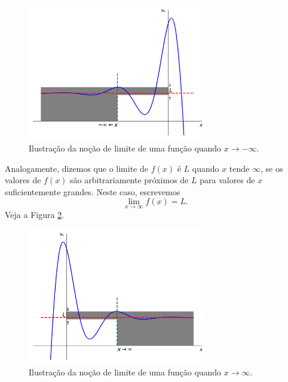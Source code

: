 \begin{figure}[H]
  \centering
  \includegraphics[width=0.7\textwidth]{./cap_lim/dados/fig_lim_x-infty/fig_lim_x-infty}
  \caption{Ilustração da noção de limite de uma função quando $x\to -\infty$.}
  \label{fig:lim_x-infty}
\end{figure}

Analogamente, dizemos que o limite de $f(x)$ é $L$ quando $x$ tende $\infty$, se os valores de $f(x)$ são arbitrariamente próximos de $L$ para valores de $x$ suficientemente grandes. Neste caso, escrevemos
\begin{equation}
  \lim_{x\to \infty} f(x) = L.
\end{equation}
Veja a Figura \ref{fig:lim_x2infty}.

\begin{figure}[H]
  \centering
  \includegraphics[width=0.7\textwidth]{./cap_lim/dados/fig_lim_x2infty/fig_lim_x2infty}
  \caption{Ilustração da noção de limite de uma função quando $x\to \infty$.}
  \label{fig:lim_x2infty}
\end{figure}


